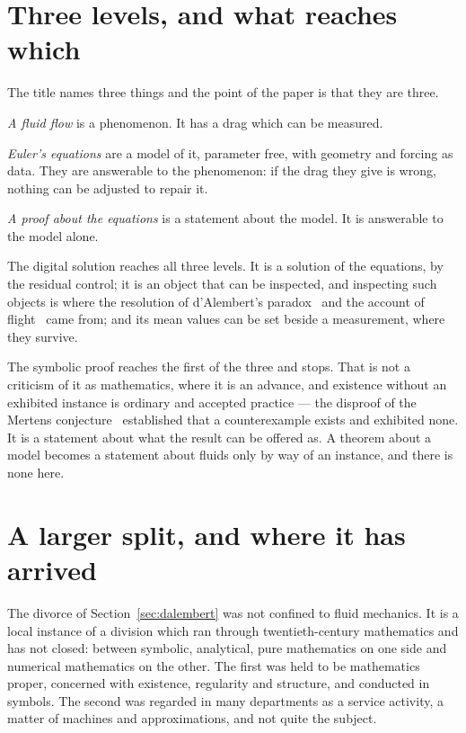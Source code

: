 \documentclass[11pt]{article}
\begin{document}
\section{Three levels, and what reaches which}\label{sec:levels}

The title names three things and the point of the paper is that they are three.

\emph{A fluid flow} is a phenomenon. It has a drag which can be measured.

\emph{Euler's equations} are a model of it, parameter free, with geometry and forcing as data. They
are answerable to the phenomenon: if the drag they give is wrong, nothing can be adjusted to repair
it.

\emph{A proof about the equations} is a statement about the model. It is answerable to the model
alone.

The digital solution reaches all three levels. It is a solution of the equations, by the residual
control; it is an object that can be inspected, and inspecting such objects is where the resolution
of d'Alembert's paradox~\cite{dalembert} and the account of flight~\cite{flight} came from; and its
mean values can be set beside a measurement, where they survive.

The symbolic proof reaches the first of the three and stops. That is not a criticism of it as
mathematics, where it is an advance, and existence without an exhibited instance is ordinary and
accepted practice --- the disproof of the Mertens conjecture~\cite{mertens} established that a
counterexample exists and exhibited none. It is a statement about what the result can be offered as.
A theorem about a model becomes a statement about fluids only by way of an instance, and there is
none here.

\section{A larger split, and where it has arrived}\label{sec:split}

The divorce of Section~\ref{sec:dalembert} was not confined to fluid mechanics. It is a local
instance of a division which ran through twentieth-century mathematics and has not closed: between
symbolic, analytical, pure mathematics on one side and numerical mathematics on the other. The first
was held to be mathematics proper, concerned with existence, regularity and structure, and conducted
in symbols. The second was regarded in many departments as a service activity, a matter of machines
and approximations, and not quite the subject.
\end{document}
